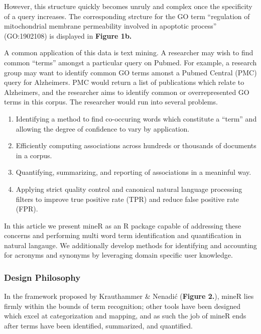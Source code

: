 \documentclass[twoside]{article}
\begin{document}
  
However, this structure quickly becomes unruly and complex once the specificity of a query increases. The corresponding strcture for the GO term ``regulation of mitochondrial membrane permeability involved in apoptotic process'' (GO:1902108) is displayed in \textbf{Figure 1b.}

A common application of this data is text mining. A researcher may wish to find common ``terms'' amongst a particular query on Pubmed. For example, a research group may want to identify common GO terms amonst a Pubmed Central (PMC) query for Alzheimers. PMC would return a list of publications which relate to Alzheimers, and the researcher aims to identify common or overrepresented GO terms in this corpus. The researcher would run into several problems.

\begin{enumerate}
\item Identifying a method to find co-occuring words which constitute a ``term'' and allowing the degree of confidence to vary by application.
\item Efficiently computing associations across hundreds or thousands of documents in a corpus.
\item Quantifying, summarizing, and reporting of associations in a meaninful way. 
\item Applying strict quality control and canonical natural language processing filters to improve true positive rate (TPR) and reduce false positive rate (FPR).
\end{enumerate}

In this article we present mineR as an R package capable of addressing these concerns and performing multi word term identification and quantification in natural langauge. We additionally develop methods for identifying and accounting for acronyms and synonyms by leveraging domain specific user knowledge.

\subsubsection{Design Philosophy}

In the framework proposed by Krauthammer \& Nenadić (\textbf{Figure 2.}), mineR lies firmly within the bounds of term recognition; other tools have been designed which excel at categorization and mapping, and as such the job of mineR ends after terms have been identified, summarized, and quantified. 
\end{document}
